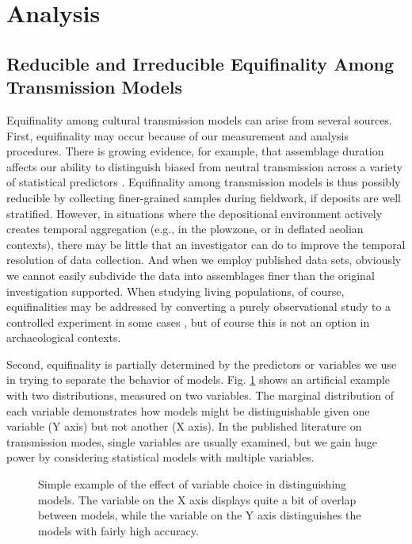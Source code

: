 \section{Analysis}\label{analysis}

\subsection{Reducible and Irreducible Equifinality Among Transmission
Models}\label{measuring-equifinality-among-transmission-models}

Equifinality among cultural transmission models can arise from several sources. First, equifinality may occur because of our measurement and analysis
procedures. There is growing evidence, for example, that assemblage
duration affects our ability to distinguish biased from neutral
transmission across a variety of statistical predictors
\cite{Madsen2012TA, Porcic2014Exploring-the-E, Premo:2014jv}. Equifinality among transmission models is thus possibly reducible by collecting finer-grained samples during fieldwork, if deposits are well stratified.  However, in situations where the depositional environment actively creates temporal aggregation (e.g., in the plowzone, or in deflated aeolian contexts), there may be little that an investigator can do to improve the temporal resolution of data collection.  And when we employ published data sets, obviously we cannot easily subdivide the data into assemblages finer than the original investigation supported.  When studying living populations, of course, equifinalities may be addressed by converting a purely observational study to a controlled experiment in some cases \cite{kempe2014experimental, mesoudi2014experimental, schillinger2014copying},
but of course this is not an option in archaeological contexts.

Second, equifinality is partially determined by the predictors or variables we use in trying to separate the behavior of models.  Fig. \ref{fig1} shows an artificial example with two distributions, measured on two variables.  The marginal distribution of each variable demonstrates how models might be distinguishable given one variable (Y axis) but not another (X axis).  In the published literature on transmission modes, single variables are usually examined, but we gain huge power by considering statistical models with multiple variables.  


\begin{figure}
	\caption{Simple example of the effect of variable choice in distinguishing models.  The variable on the X axis displays quite a bit of overlap between models, while the variable on the Y axis distinguishes the models with fairly high accuracy.}
	\label{fig1}
\end{figure}


